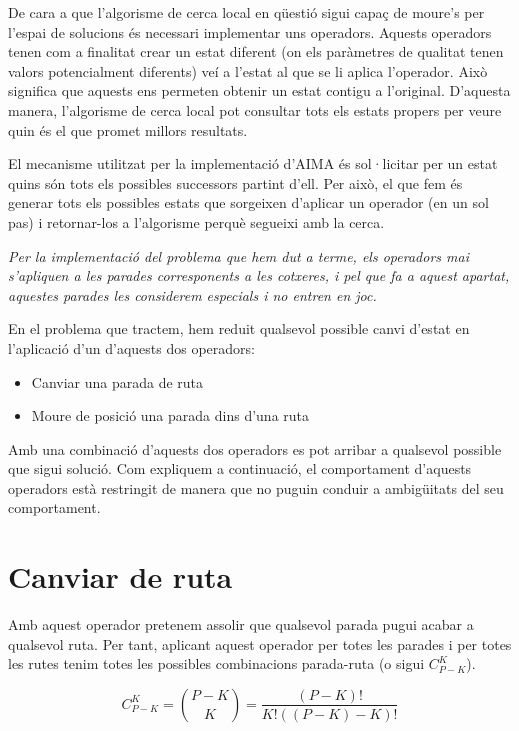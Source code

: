 
De cara a que l'algorisme de cerca local en qüestió sigui capaç de moure's per l'espai de solucions és necessari implementar uns operadors. Aquests operadors tenen com a finalitat crear un estat diferent (on els paràmetres de qualitat tenen valors potencialment diferents) veí a l'estat al que se li aplica l'operador. Això significa que aquests ens permeten obtenir un estat contigu a l'original. D'aquesta manera, l'algorisme de cerca local pot consultar tots els estats propers per veure quin és el que promet millors resultats.

El mecanisme utilitzat per la implementació d'AIMA és sol·licitar per un estat quins són tots els possibles successors partint d'ell. Per això, el que fem és generar tots els possibles estats que sorgeixen d'aplicar un operador (en un sol pas) i retornar-los a l'algorisme perquè segueixi amb la cerca.

\emph{Per la implementació del problema que hem dut a terme, els operadors mai s'apliquen a les parades corresponents a les cotxeres, i pel que fa a aquest apartat, aquestes parades les considerem especials i no entren en joc.}

En el problema que tractem, hem reduit qualsevol possible canvi d'estat en l'aplicació d'un d'aquests dos operadors:

\begin{itemize}
	\item Canviar una parada de ruta
	\item Moure de posició una parada dins d'una ruta
\end{itemize}

Amb una combinació d'aquests dos operadors es pot arribar a qualsevol possible que sigui solució. Com expliquem a continuació, el comportament d'aquests operadors està restringit de manera que no puguin conduir a ambigüitats del seu comportament.

\section{Canviar de ruta} %
\label{sec:canviar_de_ruta}

Amb aquest operador pretenem assolir que qualsevol parada pugui acabar a qualsevol ruta. Per tant, aplicant aquest operador per totes les parades i per totes les rutes tenim totes les possibles combinacions parada-ruta (o sigui $C_{P-K}^{K}$).

\[
	C_{P-K}^{K} = \binom{P-K}{K} = \dfrac{(P-K)!}{K!((P-K)-K)!}
\]

